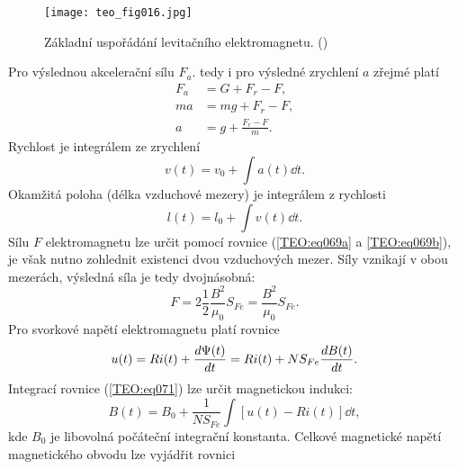 {      \begin{figure}[ht!]  %
        \centering
        \texttt{[image: teo\_fig016.jpg]}
        \caption{Základní uspořádání levitačního elektromagnetu.
                 (\cite[s.~16]{Patocka4})}
        \label{teo:fig016}
      \end{figure}
      Pro výslednou akcelerační sílu \(F_a\). tedy i pro výsledné zrychlení \(a\) zřejmé platí
      \begin{subequations}
      \label{TEO:eq063}
        \begin{align}
          F_a &= G + F_r - F,             \label{TEO:eq063a} \\
          ma  &= mg + F_r - F,            \label{TEO:eq063b} \\
          a   &= g + \frac{F_r -F}{m}.    \label{TEO:eq063c}
        \end{align}
      \end{subequations}
      Rychlost je integrálem ze zrychlení
      \begin{equation}\label{TEO:eq066}
        v(t) = v_0 + \int{a(t)\dd{t}}.
      \end{equation}
      Okamžitá poloha (délka vzduchové mezery) je integrálem z rychlosti
      \begin{equation}\label{TEO:eq067}
        l(t) = l_0 + \int{v(t)\dd{t}}.
      \end{equation}
      Sílu \(F\) elektromagnetu lze určit pomocí rovnice (\ref{TEO:eq069a} a \ref{TEO:eq069b}), je 
      však nutno zohlednit existenci dvou vzduchových mezer. Síly vznikají v obou mezerách, 
      výsledná síla je tedy dvojnásobná:
      \begin{equation}\label{TEO:eq070}
        F = 2\frac{1}{2}\frac{B^2}{\mu_0}S_{Fe} = \frac{B^2}{\mu_0}S_{Fe}.
      \end{equation}
      Pro svorkové napětí elektromagnetu platí rovnice
      \begin{equation}\label{TEO:eq071}
        u(t) = Ri(t) + \dfrac{d \Psi(t)}{d t} = Ri(t) + NS_{Fe}\dfrac{d B(t)}{d t}.
      \end{equation} 
      Integrací rovnice (\ref{TEO:eq071}) lze určit magnetickou indukci:
      \begin{equation}\label{TEO:eq072}
      B(t) = B_0 + \frac{1}{NS_{Fe}}\int\left[u(t) - Ri(t)\right]\dd{t},
      \end{equation}
      kde \(B_0\) je libovolná počáteční integrační konstanta. Celkové magnetické napětí 
      magnetického obvodu lze vyjádřit rovnici
}
